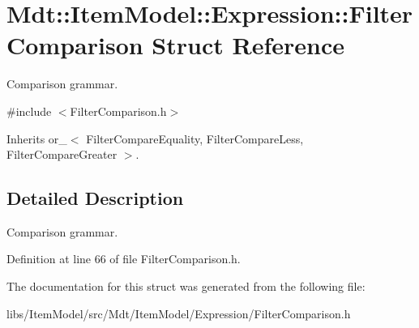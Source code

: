 \hypertarget{struct_mdt_1_1_item_model_1_1_expression_1_1_filter_comparison}{}\section{Mdt\+:\+:Item\+Model\+:\+:Expression\+:\+:Filter\+Comparison Struct Reference}
\label{struct_mdt_1_1_item_model_1_1_expression_1_1_filter_comparison}


Comparison grammar.  




{\ttfamily \#include $<$Filter\+Comparison.\+h$>$}



Inherits or\+\_\+$<$ Filter\+Compare\+Equality, Filter\+Compare\+Less, Filter\+Compare\+Greater $>$.



\subsection{Detailed Description}
Comparison grammar. 

Definition at line 66 of file Filter\+Comparison.\+h.



The documentation for this struct was generated from the following file\+:\begin{DoxyCompactItemize}
\item 
libs/\+Item\+Model/src/\+Mdt/\+Item\+Model/\+Expression/Filter\+Comparison.\+h\end{DoxyCompactItemize}

